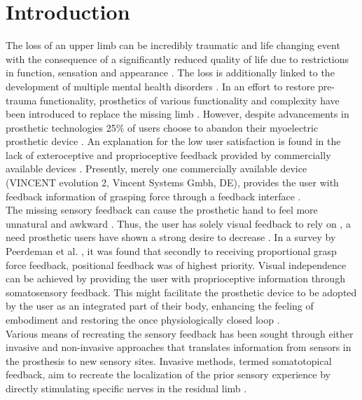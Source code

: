 \chapter{Introduction}

The loss of an upper limb can be incredibly traumatic and life changing event with the consequence of a significantly reduced quality of life due to restrictions in function, sensation and appearance \cite{Schofield2014,Ostlie2011}. The loss is additionally linked to the development of multiple mental health disorders \cite{Ostlie2011}.
In an effort to restore pre-trauma functionality, prosthetics of various functionality and complexity have been introduced to replace the missing limb \cite{Geethanjali2016}. However, despite advancements in prosthetic technologies 25\% of users choose to abandon their myoelectric prosthetic device \cite{Biddiss2007a}. An explanation for the low user satisfaction is found in the lack of exteroceptive and proprioceptive feedback provided by commercially available devices \cite{Peerdeman2011}. Presently, merely one commercially available device (VINCENT evolution 2, Vincent Systems Gmbh, DE), provides the user with feedback information of grasping force through a feedback interface \cite{Systems2005}. \\    
%
The missing sensory feedback can cause the prosthetic hand to feel more unnatural and awkward \cite{Pamungkas2015}. Thus, the user has solely visual feedback to rely on \cite{Pamungkas2015,Stephens-Fripp2018}, a need prosthetic users have shown a strong desire to decrease \cite{Atkins1996}. In a survey by Peerdeman et al. \cite{Peerdeman2011}, it was found that secondly to receiving proportional grasp force feedback, positional feedback was of highest priority. Visual independence can be achieved by providing the user with proprioceptive information through somatosensory feedback. This might facilitate the prosthetic device to be adopted by the user as an integrated part of their body, enhancing the feeling of embodiment and restoring the once physiologically closed loop \cite{Stephens-Fripp2018,Xu2016,Strbac2016,Geng2012}. \\
%
Various means of recreating the sensory feedback has been sought through either invasive and non-invasive approaches that translates information from sensors in the prosthesis to new sensory sites. Invasive methods, termed somatotopical feedback, aim to recreate the localization of the prior sensory experience by directly stimulating specific nerves in the residual limb \cite{Schofield2014,Stephens-Fripp2018}.
